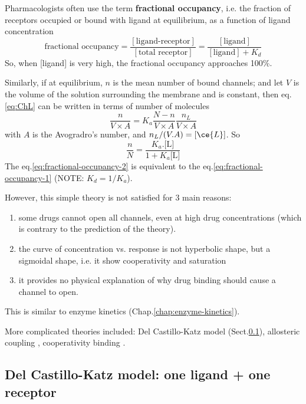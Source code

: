 Pharmacologists often use the term {\bf fractional occupancy}, i.e. the fraction
of receptors occupied or bound with ligand at equilibrium, as a function of
ligand concentration
\begin{equation}
\text{fractional occupancy} = \frac{[\text{ligand-receptor}]}{[\text{total
receptor}]} = \frac{[\text{ligand}]}{[\text{ligand}] + K_d}
\label{eq:fractional-occupancy-1}
\end{equation}
So, when [ligand] is very high, the fractional occupancy approaches 100\%.

Similarly, if at equilibrium, $n$ is the mean number of bound channels; and let
$V$ is the volume of the solution surrounding the membrane and is constant, then
eq.\ref{eq:ChL} can be written in terms of number of molecules
\begin{equation}
\frac{n}{V\times A} = K_a	\frac{N-n}{V\times A}\frac{n_L}{V\times A}
\end{equation}
with $A$ is the Avogradro's number, and $n_L/(V.A) = [\ce{L}]$.
So
\begin{equation}
\frac{n}{N} = \frac{K_a.\text{[L]}}{1+K_a\text{[L]}}
\label{eq:fractional-occupancy-2}
\end{equation}
The eq.\ref{eq:fractional-occupancy-2} is equivalent to the
eq.\ref{eq:fractional-occupancy-1} (NOTE: $K_d=1/K_a$).

However, this simple theory is not satisfied for 3 main reasons:
\begin{enumerate}
  \item some drugs cannot open all channels, even at high drug concentrations
  (which is contrary to the prediction of the theory).

  \item the curve of concentration vs. response is not hyperbolic shape, but a
  sigmoidal shape, i.e. it show cooperativity and saturation
  \item it provides no physical explanation of why drug binding should cause a
  channel to open.
\end{enumerate}
This is similar to enzyme kinetics (Chap.\ref{chap:enzyme-kinetics}).

More complicated theories included: Del Castillo-Katz model
(Sect.\ref{sec:binding_3state}), allosteric coupling \citep{karlin1967,
thron1973}, cooperativity binding \citep{changeux1968, colquhoun1973}.

\subsection{Del Castillo-Katz model: one ligand + one receptor}
\label{sec:binding_3state}

